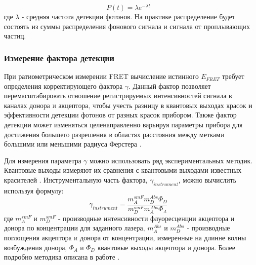\begin{equation}
    P(t)= \lambda e^{- \lambda t}
\end{equation}
где $\lambda$ - средняя частота детекции фотонов.
На практике распределение будет состоять из суммы распределения фонового сигнала и сигнала от проплывающих частиц.



\subsubsection{Измерение фактора детекции}
При ратиометрическом измерении FRET вычисление истинного $E_{FRET}$ требует определения корректирующего фактора $\gamma$. Данный фактор позволяет перемасштабировать отношение регистрируемых интенсивностей сигнала в каналах донора и акцептора, чтобы учесть разницу в квантовых выходах красок и эффективности детекции фотонов от разных красок прибором. Также фактор детекции может изменяться целенаправленно варьируя параметры прибора для достижения большего разрешения в областях расстояния между метками большими или меньшими радиуса Ферстера \cite{gansen_structural_2009}. 

Для измерения параметра $\gamma$ можно использовать ряд экспериментальных методик. Квантовые выходы измеряют их сравнения с квантовыми выходами известных красителей \cite{williams_relative_1983}. Инструментальную часть фактора, $\gamma_{instrument}$, можно вычислить используя формулу:
\begin{equation}
    \gamma_{instrument} = \frac{m_{A}^{smF} m_{D}^{Abs} \Phi_{D}}{m_{D}^{smF} m_{A}^{Abs} \Phi_{A}}
\end{equation}
    где $m_{A}^{smF}$ и $m_{D}^{smF}$ - производные интенсивности флуоресценции акцептора и донора по концентрации для заданного лазера, $m_{A}^{Abs}$ и $m_{D}^{Abs}$ - производные поглощения акцептора и донора от концентрации, измеренные на длинне волны возбуждения донора, $\Phi_A$ и $\Phi_D$ квантовые выходы акцептора и донора. Более подробно методика описана в работе \cite{ferreon_interplay_2009}.

